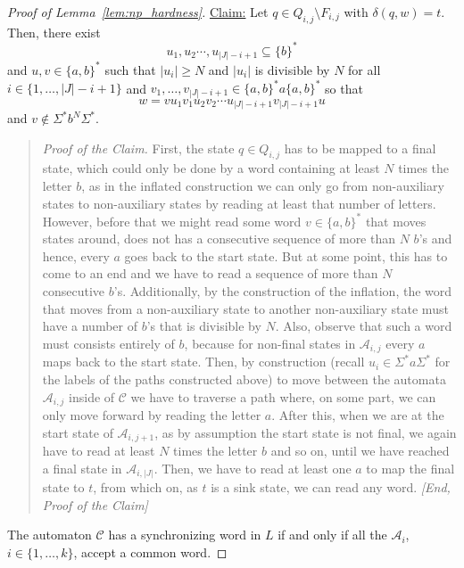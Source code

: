 \begin{toappendix}
\begin{proof}[Proof of Lemma~\ref{lem:np_hardness}]
\noindent\underline{Claim:}
  Let $q \in Q_{i,j} \setminus F_{i,j}$ with $\delta(q, w) = t$.
  Then, there exist 
  \[ 
  u_1, u_2 \cdots, u_{|J|-i+1} \subseteq \{b\}^*
  \]
  and $u,v\in \{a,b\}^*$
  such that $|u_i| \ge N$ and $|u_i|$ is divisible by $N$
  for all $i \in \{1,\ldots,|J|-i+1\}$
  and $v_1, \ldots, v_{|J|-i+1} \in \{a,b\}^*a\{a,b\}^*$
  so that 
  \[
   w = vu_1 v_1 u_2 v_2 \cdots u_{|J|-i+1} v_{|J|-i+1} u
  \]
  and $v \notin \Sigma^* b^N \Sigma^*$.
 \begin{quote} %
     \emph{Proof of the Claim.} First, the state $q \in Q_{i,j}$ has to be mapped to a final
     state, which could only be done by a word containing at least $N$
     times the letter $b$,
     as in the inflated construction we can only go from non-auxiliary states
     to non-auxiliary states by reading at least that number of letters.
     However, before that we might read some word $v \in \{a,b\}^*$ that moves states around, does
     not has a consecutive sequence of more than $N$ $b$'s and hence, every $a$
     goes back to the start state. But at some point, this has to come to an end and we have
     to read a sequence of more than $N$ consecutive $b$'s.
     Additionally, by the construction of the inflation, the word
     that moves from a non-auxiliary state to another non-auxiliary state
     must have a number of $b$'s that is divisible by $N$.
     Also, observe that such a word must consists entirely of $b$, because
     for non-final states in $\mathcal A_{i,j}$ every $a$ maps back to the start state.
     Then, by construction (recall $u_i \in \Sigma^* a \Sigma^*$ for the labels
     of the paths constructed above) to move between the automata $\mathcal A_{i,j}$
     inside of $\mathcal C$
     we have to traverse a path
     where, on some part, we can only move forward by reading the letter $a$.
     After this, when we are at the start state of $\mathcal A_{i,j+1}$,
     as by assumption the start state is not final, we again have to read at least $N$
     times the letter $b$ and so on, until we have reached a final 
     state in $\mathcal A_{i,|J|}$.
     Then, we have to read at least one $a$ to map the final state to $t$, from which
     on, as $t$ is a sink state, we can read any word. 
     \emph{[End, Proof of the Claim]}
 \end{quote}
 
 
 The automaton $\mathcal C$ has a synchronizing word in $L$
 if and only if all the $\mathcal A_i$, $i \in \{1,\ldots,k\}$,
 accept a common word.
 

\end{proof}
\end{toappendix}
